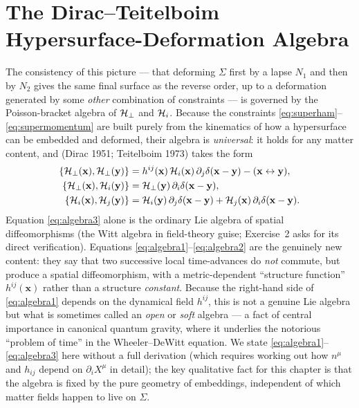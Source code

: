 \section{The Dirac--Teitelboim Hypersurface-Deformation Algebra}
\label{sec:dirac-algebra}

The consistency of this picture --- that deforming $\Sigma$ first by a lapse
$N_1$ and then by $N_2$ gives the same final surface as the reverse order, up
to a deformation generated by some \emph{other} combination of constraints ---
is governed by the Poisson-bracket algebra of $\mathcal{H}_\perp$ and $\mathcal{H}_i$.
Because the constraints \eqref{eq:superham}--\eqref{eq:supermomentum} are built
purely from the kinematics of how a hypersurface can be embedded and deformed,
their algebra is \emph{universal}: it holds for any matter content, and (Dirac
1951; Teitelboim 1973) takes the form
\begin{align}
\{\mathcal{H}_\perp(\mathbf{x}),\mathcal{H}_\perp(\mathbf{y})\} &= 
    h^{ij}(\mathbf{x})\,\mathcal{H}_i(\mathbf{x})\,\partial_j\delta(\mathbf{x}-
    \mathbf{y}) - (\mathbf{x}\leftrightarrow\mathbf{y}), 
    \label{eq:algebra1}\\
\{\mathcal{H}_\perp(\mathbf{x}),\mathcal{H}_i(\mathbf{y})\} &= \mathcal{H}_\perp(\mathbf{y})\,
    \partial_i\delta(\mathbf{x}-\mathbf{y}), \label{eq:algebra2}\\
\{\mathcal{H}_i(\mathbf{x}),\mathcal{H}_j(\mathbf{y})\} &= \mathcal{H}_i(\mathbf{y})\,
    \partial_j\delta(\mathbf{x}-\mathbf{y}) + \mathcal{H}_j(\mathbf{x})\,
    \partial_i\delta(\mathbf{x}-\mathbf{y}). \label{eq:algebra3}
\end{align}
Equation \eqref{eq:algebra3} alone is the ordinary Lie algebra of spatial
diffeomorphisms (the Witt algebra in field-theory guise; Exercise~2 asks for
its direct verification). Equations \eqref{eq:algebra1}--\eqref{eq:algebra2}
are the genuinely new content: they say that two successive local time-advances
do \emph{not} commute, but produce a spatial diffeomorphism, with a
metric-dependent ``structure function'' $h^{ij}(\mathbf{x})$ rather than a
structure \emph{constant}. Because the right-hand side of \eqref{eq:algebra1}
depends on the dynamical field $h^{ij}$, this is not a genuine Lie algebra but
what is sometimes called an \emph{open} or \emph{soft} algebra --- a fact of
central importance in canonical quantum gravity, where it underlies the
notorious ``problem of time'' in the Wheeler--DeWitt equation. We state
\eqref{eq:algebra1}--\eqref{eq:algebra3} here without a full derivation (which
requires working out how $n^\mu$ and $h_{ij}$ depend on $\partial_iX^\mu$ in
detail); the key qualitative fact for this chapter is that the algebra is fixed
by the pure geometry of embeddings, independent of which matter fields happen
to live on $\Sigma$.

